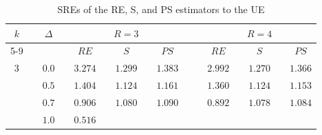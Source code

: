 \documentclass[twoside]{article}
\begin{document}
\begin{table}[h]
\begin{center}
\small
\caption{SREs of the RE, S, and PS estimators to the UE}\label{Tab1} 
\begin{tabular}{ | c | c c | c c c c c c | c c c c c c c | }
\hline 
\multicolumn{1}{|c}{$ k $} & 
\multicolumn{1}{c}{} & 
\multicolumn{1}{c}{$ \Delta $} & 
\multicolumn{1}{c}{} & 
\multicolumn{5}{c}{$ R = 3 $} &
\multicolumn{2}{c}{} & 
\multicolumn{5}{c|}{$ R = 4 $} 
\\ 
\cline{5-9} \cline{12-16}
\multicolumn{1}{|c}{} & 
\multicolumn{1}{c}{} & 
\multicolumn{1}{c}{} & 
\multicolumn{1}{c}{} & 
\multicolumn{1}{c}{$ RE $} & 
\multicolumn{1}{c}{} & 
\multicolumn{1}{c}{$ S $} &
\multicolumn{1}{c}{} & 
\multicolumn{1}{c}{$ PS $}  &
\multicolumn{2}{c}{} & 
\multicolumn{1}{c}{$ RE $} & 
\multicolumn{1}{c}{} & 
\multicolumn{1}{c}{$ S $} &
\multicolumn{1}{c}{} & 
\multicolumn{1}{c|}{$ PS $}
\\ 
\hline
\hline
\multicolumn{1}{|c}{$ 3 $} & 
\multicolumn{1}{c}{} & 
\multicolumn{1}{c}{$ 0.0 $} & 
\multicolumn{1}{c}{} & 
\multicolumn{1}{c}{$ 3.274 $} &   
\multicolumn{1}{c}{} & 
\multicolumn{1}{c}{$ 1.299 $} & 
\multicolumn{1}{c}{} & 
\multicolumn{1}{c}{$ 1.383 $} &
\multicolumn{2}{c}{} & 
\multicolumn{1}{c}{$ 2.992 $} &   
\multicolumn{1}{c}{} & 
\multicolumn{1}{c}{$ 1.270 $} & 
\multicolumn{1}{c}{} & 
\multicolumn{1}{c|}{$ 1.366 $} 
\\  
\multicolumn{1}{|c}{} & 
\multicolumn{1}{c}{} & 
\multicolumn{1}{c}{$ 0.5 $} & 
\multicolumn{1}{c}{} & 
\multicolumn{1}{c}{$ 1.404 $} &   
\multicolumn{1}{c}{} & 
\multicolumn{1}{c}{$ 1.124 $} & 
\multicolumn{1}{c}{} & 
\multicolumn{1}{c}{$ 1.161 $} &
\multicolumn{2}{c}{} & 
\multicolumn{1}{c}{$ 1.360 $} &   
\multicolumn{1}{c}{} & 
\multicolumn{1}{c}{$ 1.124 $} & 
\multicolumn{1}{c}{} & 
\multicolumn{1}{c|}{$ 1.153 $}
\\    
\multicolumn{1}{|c}{} & 
\multicolumn{1}{c}{} & 
\multicolumn{1}{c}{$ 0.7 $} & 
\multicolumn{1}{c}{} & 
\multicolumn{1}{c}{$ 0.906 $} &   
\multicolumn{1}{c}{} & 
\multicolumn{1}{c}{$ 1.080 $} & 
\multicolumn{1}{c}{} & 
\multicolumn{1}{c}{$ 1.090 $} &
\multicolumn{2}{c}{} & 
\multicolumn{1}{c}{$ 0.892 $} &   
\multicolumn{1}{c}{} & 
\multicolumn{1}{c}{$ 1.078 $} & 
\multicolumn{1}{c}{} & 
\multicolumn{1}{c|}{$ 1.084 $}
\\  
\multicolumn{1}{|c}{} & 
\multicolumn{1}{c}{} & 
\multicolumn{1}{c}{$ 1.0 $} & 
\multicolumn{1}{c}{} & 
\multicolumn{1}{c}{$ 0.516 $} &   
\multicolumn{1}{c}{} & 

\end{tabular}
\end{center}
\end{table}
\end{document}
